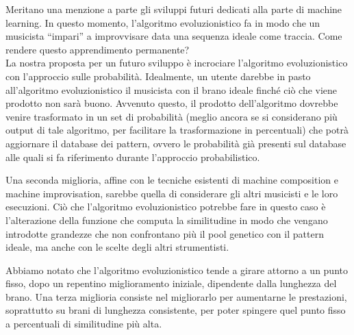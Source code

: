 
Meritano una menzione a parte gli sviluppi futuri dedicati alla parte di machine learning.
In questo momento, l'algoritmo evoluzionistico fa in modo che un musicista ``impari'' a improvvisare data una sequenza ideale come traccia.
Come rendere questo apprendimento permanente?\\
La nostra proposta per un futuro sviluppo è incrociare l'algoritmo evoluzionistico con l'approccio sulle probabilità.
Idealmente, un utente darebbe in pasto all'algoritmo evoluzionistico il musicista con il brano ideale finché ciò che viene prodotto non sarà buono.
Avvenuto questo, il prodotto dell'algoritmo dovrebbe venire trasformato in un set di probabilità (meglio ancora se si considerano più output di tale algoritmo, per facilitare la trasformazione in percentuali) che potrà aggiornare il database dei pattern, ovvero le probabilità già presenti sul database alle quali si fa riferimento durante l'approccio probabilistico.
\newline

Una seconda miglioria, affine con le tecniche esistenti di machine composition e machine improvisation, sarebbe quella di considerare gli altri musicisti e le loro esecuzioni.
Ciò che l'algoritmo evoluzionistico potrebbe fare in questo caso è l'alterazione della funzione che computa la similitudine in modo che vengano introdotte grandezze che non confrontano più il pool genetico con il pattern ideale, ma anche con le scelte degli altri strumentisti.
\newline

Abbiamo notato che l'algoritmo evoluzionistico tende a girare attorno a un punto fisso, dopo un repentino miglioramento iniziale, dipendente dalla lunghezza del brano.
Una terza miglioria consiste nel migliorarlo per aumentarne le prestazioni, soprattutto su brani di lunghezza consistente, per poter spingere quel punto fisso a percentuali di similitudine più alta.
